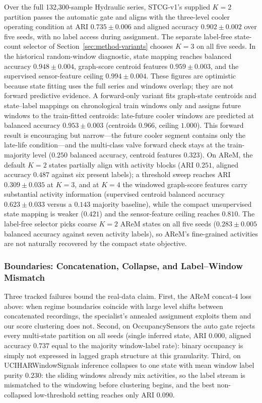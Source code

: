 \documentclass[sigconf,anonymous]{acmart}
\begin{document}
Over the full 132,300-sample Hydraulic series, STCG-v1's supplied $K{=}2$ partition passes the automatic gate and aligns with the three-level cooler operating condition at ARI $0.735 \pm 0.006$ and aligned accuracy $0.902 \pm 0.002$ over five seeds, with no label access during assignment.
The separate label-free state-count selector of Section~\ref{sec:method-variants} chooses $K{=}3$ on all five seeds. In the historical random-window diagnostic, state mapping reaches balanced accuracy $0.948 \pm 0.004$, graph-score centroid features $0.959 \pm 0.003$, and the supervised sensor-feature ceiling $0.994 \pm 0.004$. These figures are optimistic because state fitting uses the full series and windows overlap; they are not forward predictive evidence.
A forward-only variant fits graph-state centroids and state--label mappings on chronological train windows only and assigns future windows to the train-fitted centroids: late-future cooler windows are predicted at balanced accuracy $0.953 \pm 0.003$ (centroids $0.966$, ceiling $1.000$).
This forward result is encouraging but narrow---the future cooler segment contains only the late-life condition---and the multi-class valve forward check stays at the train-majority level ($0.250$ balanced accuracy, centroid features $0.323$).
On AReM, the default $K{=}2$ states partially align with activity blocks (ARI $0.251$, aligned accuracy $0.487$ against six present labels); a threshold sweep reaches ARI $0.309 \pm 0.035$ at $K{=}3$, and at $K{=}4$ the windowed graph-score features carry substantial activity information (supervised centroid balanced accuracy $0.623 \pm 0.033$ versus a $0.143$ majority baseline), while the compact unsupervised state mapping is weaker ($0.421$) and the sensor-feature ceiling reaches $0.810$.
The label-free selector picks coarse $K{=}2$ AReM states on all five seeds ($0.283 \pm 0.005$ balanced accuracy against seven activity labels), so AReM's fine-grained activities are not naturally recovered by the compact state objective.

\subsubsection{Boundaries: Concatenation, Collapse, and Label--Window Mismatch}
\label{sec:exp-real-boundaries}

Three tracked failures bound the real-data claim.
First, the AReM concat-4 loss above: when regime boundaries coincide with large level shifts between concatenated recordings, the specialist's annealed assignment exploits them and our score clustering does not.
Second, on OccupancySensors the auto gate rejects every multi-state partition on all seeds (single inferred state, ARI $0.000$, aligned accuracy $0.737$ equal to the majority window-label rate): binary occupancy is simply not expressed in lagged graph structure at this granularity.
Third, on UCIHARWindowSignals inference collapses to one state with mean window label purity $0.230$: the sliding windows already mix activities, so the label stream is mismatched to the windowing before clustering begins, and the best non-collapsed low-threshold setting reaches only ARI $0.090$.
\end{document}
